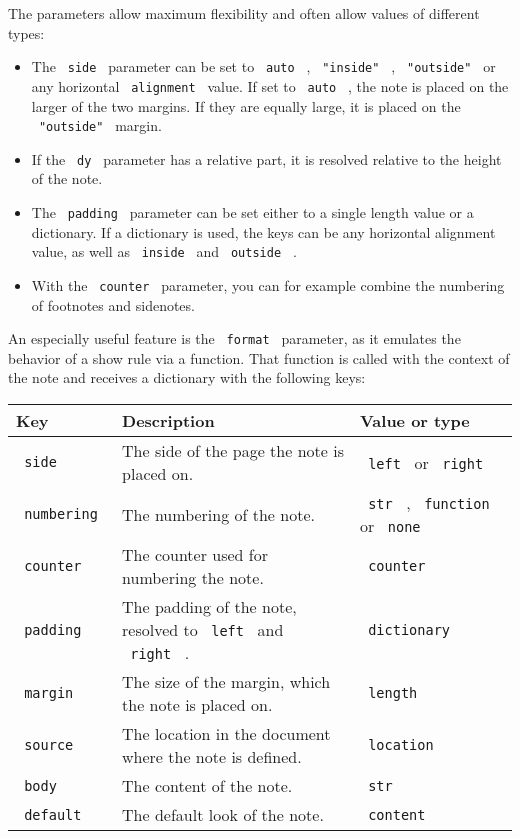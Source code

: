 The parameters allow maximum flexibility and often allow values of
different types:

\begin{itemize}
\tightlist
\item
  The \texttt{\ side\ } parameter can be set to \texttt{\ auto\ } ,
  \texttt{\ "inside"\ } , \texttt{\ "outside"\ } or any horizontal
  \texttt{\ alignment\ } value. If set to \texttt{\ auto\ } , the note
  is placed on the larger of the two margins. If they are equally large,
  it is placed on the \texttt{\ "outside"\ } margin.
\item
  If the \texttt{\ dy\ } parameter has a relative part, it is resolved
  relative to the height of the note.
\item
  The \texttt{\ padding\ } parameter can be set either to a single
  length value or a dictionary. If a dictionary is used, the keys can be
  any horizontal alignment value, as well as \texttt{\ inside\ } and
  \texttt{\ outside\ } .
\item
  With the \texttt{\ counter\ } parameter, you can for example combine
  the numbering of footnotes and sidenotes.
\end{itemize}

An especially useful feature is the \texttt{\ format\ } parameter, as it
emulates the behavior of a show rule via a function. That function is
called with the context of the note and receives a dictionary with the
following keys:

\begin{longtable}[]{@{}lll@{}}
\toprule\noalign{}
Key & Description & Value or type \\
\midrule\noalign{}
\endhead
\bottomrule\noalign{}
\endlastfoot
\texttt{\ side\ } & The side of the page the note is placed on. &
\texttt{\ left\ } or \texttt{\ right\ } \\
\texttt{\ numbering\ } & The numbering of the note. & \texttt{\ str\ } ,
\texttt{\ function\ } or \texttt{\ none\ } \\
\texttt{\ counter\ } & The counter used for numbering the note. &
\texttt{\ counter\ } \\
\texttt{\ padding\ } & The padding of the note, resolved to
\texttt{\ left\ } and \texttt{\ right\ } . & \texttt{\ dictionary\ } \\
\texttt{\ margin\ } & The size of the margin, which the note is placed
on. & \texttt{\ length\ } \\
\texttt{\ source\ } & The location in the document where the note is
defined. & \texttt{\ location\ } \\
\texttt{\ body\ } & The content of the note. & \texttt{\ str\ } \\
\texttt{\ default\ } & The default look of the note. &
\texttt{\ content\ } \\
\end{longtable}

